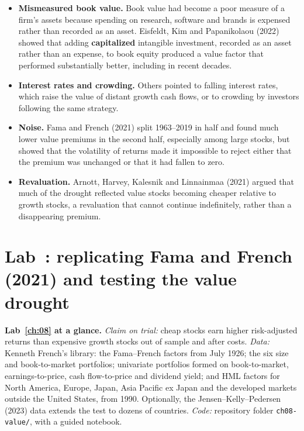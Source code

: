 \begin{itemize}
  \item \textbf{Mismeasured book value.} Book value had become a poor measure of a firm's assets because spending on research, software and brands is expensed rather than recorded as an asset. Eisfeldt, Kim and Papanikolaou (2022) showed that adding \textbf{capitalized} intangible investment, recorded as an asset rather than an expense, to book equity produced a value factor that performed substantially better, including in recent decades.
  \item \textbf{Interest rates and crowding.} Others pointed to falling interest rates, which raise the value of distant growth cash flows, or to crowding by investors following the same strategy.
  \item \textbf{Noise.} Fama and French (2021) split 1963--2019 in half and found much lower value premiums in the second half, especially among large stocks, but showed that the volatility of returns made it impossible to reject either that the premium was unchanged or that it had fallen to zero.
  \item \textbf{Revaluation.} Arnott, Harvey, Kalesnik and Linnainmaa (2021) argued that much of the drought reflected value stocks becoming cheaper relative to growth stocks, a revaluation that cannot continue indefinitely, rather than a disappearing premium.
\end{itemize}

\section{Lab~\thechapter: replicating Fama and French (2021) and testing the value drought}
\label{sec:08-lab}

\begin{callout}
\textbf{Lab~\ref{ch:08} at a glance.} \emph{Claim on trial:} cheap stocks earn higher risk-adjusted returns than expensive growth stocks out of sample and after costs. \emph{Data:} Kenneth French's library: the Fama--French factors from July 1926; the six size and book-to-market portfolios; univariate portfolios formed on book-to-market, earnings-to-price, cash flow-to-price and dividend yield; and HML factors for North America, Europe, Japan, Asia Pacific ex Japan and the developed markets outside the United States, from 1990. Optionally, the Jensen--Kelly--Pedersen (2023) data extends the test to dozens of countries. \emph{Code:} repository folder \texttt{ch08-value/}, with a guided notebook.
\end{callout}

